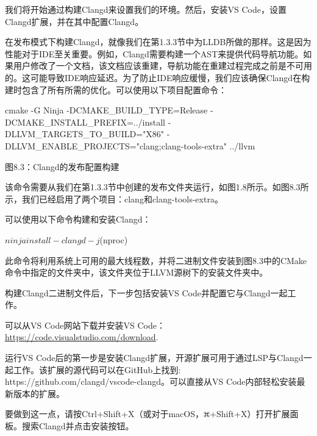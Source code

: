 我们将开始通过构建Clangd来设置我们的环境。然后，安装VS Code，设置Clangd扩展，并在其中配置Clangd。


在发布模式下构建Clangd，就像我们在第1.3.3节中为LLDB所做的那样。这是因为性能对于IDE至关重要。例如，Clangd需要构建一个AST来提供代码导航功能。如果用户修改了一个文档，该文档应该重建，导航功能在重建过程完成之前是不可用的。这可能导致IDE响应延迟。为了防止IDE响应缓慢，我们应该确保Clangd在构建时包含了所有所需的优化。可以使用以下项目配置命令：

\begin{shell}
cmake -G Ninja -DCMAKE_BUILD_TYPE=Release -DCMAKE_INSTALL_PREFIX=../install -DLLVM_TARGETS_TO_BUILD="X86" -DLLVM_ENABLE_PROJECTS="clang;clang-tools-extra" ../llvm
\end{shell}

\begin{center}
图8.3：Clangd的发布配置构建
\end{center}

该命令需要从我们在第1.3.3节中创建的发布文件夹运行，如图1.8所示。如图8.3所示，我们已经启用了两个项目：clang和clang-tools-extra。

可以使用以下命令构建和安装Clangd：

\begin{shell}
$ ninja install-clangd -j $(nproc)
\end{shell}

此命令将利用系统上可用的最大线程数，并将二进制文件安装到图8.3中的CMake命令中指定的文件夹中，该文件夹位于LLVM源树下的安装文件夹中。

构建Clangd二进制文件后，下一步包括安装VS Code并配置它与Clangd一起工作。


可以从VS Code网站下载并安装VS Code： \url{https://code.visualstudio.com/download}.

运行VS Code后的第一步是安装Clangd扩展，开源扩展可用于通过LSP与Clangd一起工作。该扩展的源代码可以在GitHub上找到: https://github.com/clangd/vscode-clangd。可以直接从VS Code内部轻松安装最新版本的扩展。

要做到这一点，请按Ctrl+Shift+X（或对于macOS，\includegraphics[width=0.02\textwidth]{content/part2/chapter8/images/3.png}+Shift+X）打开扩展面板。搜索Clangd并点击安装按钮。



